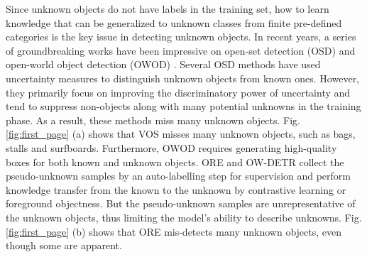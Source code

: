 \documentclass[10pt,twocolumn,letterpaper]{article}
\newcommand{\xf}[1]{{\color{black} #1}}
\begin{document}
Since unknown objects \xf{do not have labels} in the training set,
how to learn knowledge that can be generalized to unknown classes from finite pre-defined categories is the key issue in detecting unknown objects.
In recent years,
a series of groundbreaking works have been impressive on open-set detection (OSD) \cite{vos,gal2016dropout, miller2018dropout, du2022unknown} and open-world object detection (OWOD) \cite{owod, OWDETR, yang2021objects, wu2022uc}.
Several OSD \xf{methods} have \xf{used} uncertainty measures to distinguish unknown objects from known ones.
However, they primarily focus on improving the \xf{discriminatory} power of uncertainty and tend to suppress non-objects along with many potential unknowns in the training phase.
As a result, these methods \xf{miss many} unknown objects.
Fig. \ref{fig:first_page} (a) shows that VOS \cite{vos} misses many unknown objects, such as bags, stalls and surfboards.
Furthermore,
OWOD requires generating high-quality boxes for both known and unknown objects.
ORE \cite{owod} and OW-DETR \cite{OWDETR} collect the pseudo-unknown samples by an auto-labelling step for supervision
and perform knowledge transfer from the known to the unknown by contrastive learning or foreground objectness.
\xf{But} 
the pseudo-unknown samples are unrepresentative of the unknown objects, thus limiting the model's ability to describe unknowns.
Fig. \ref{fig:first_page} (b) shows that ORE \cite{owod} mis-detects many unknown objects,
even though some are apparent.
\end{document}
